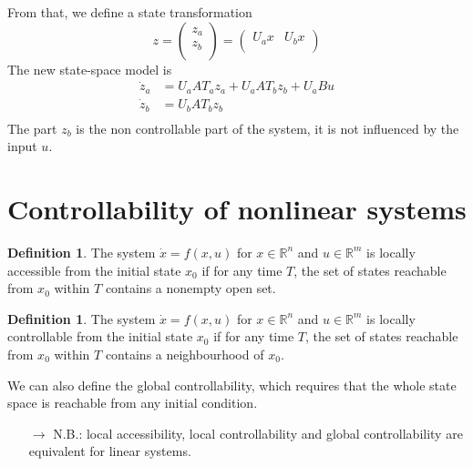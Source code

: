 \documentclass[12pt, openany]{report}
\theoremstyle{definition}
\newtheorem{definition}[thm]{Definition}
\newcommand{\R}{\mathbb{R}}
\begin{document}
From that, we define a state transformation 
\begin{equation}
    z = \begin{pmatrix}
        z_a \\ z_b\\
    \end{pmatrix} = \begin{pmatrix}
        U_ax & U_bx\\
    \end{pmatrix}
\end{equation}
The new state-space model is 
\begin{align}
    \dot z_a &= U_aAT_az_a + U_aAT_bz_b + U_aBu\\
    \dot z_b &= U_bAT_bz_b\\
\end{align}
The part \(z_b\) is the non controllable part of the system, it is not influenced by the input \(u\).
\section{Controllability of nonlinear systems}
\begin{definition}
    The system \(\dot x = f(x,u)\) for \(x\in \R^n\) and \(u\in \R^m\) is locally accessible from the initial state \(x_0\) if for any time \(T\), the set of states reachable from \(x_0\) within \(T\) contains a nonempty open set.
\end{definition}
\begin{definition}
    The system \(\dot x=f(x,u)\) for \(x\in \R^n\) and \(u\in \R^m\) is locally controllable from the initial state \(x_0\) if for any time \(T\), the set of states reachable from \(x_0\) within \(T\) contains a neighbourhood of \(x_0\). 
\end{definition}
We can also define the global controllability, which requires that the whole state space is reachable from any initial condition. 
\begin{itemize}
    \item [\(\rightarrow\)] N.B.: local accessibility, local controllability and global controllability are equivalent for linear systems.
\end{itemize}
\end{document}
